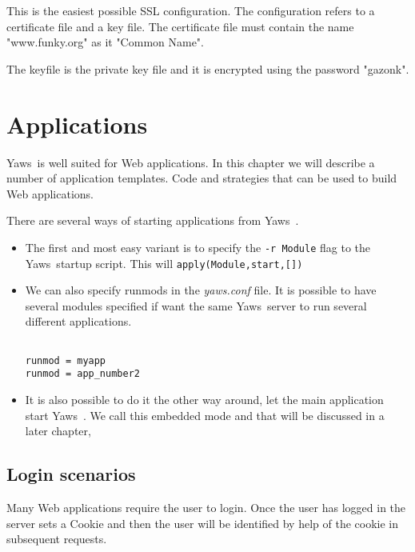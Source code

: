 \documentclass[11pt,oneside,english]{book}
\newcommand{\Yaws}            %
        {{\sc Yaws}}
\begin{document}
This is the easiest possible SSL configuration. The configuration
refers to a certificate file and a key file. The certificate file
must contain the name "www.funky.org" as it "Common Name".

The keyfile is the private key file and it is encrypted using
the password "gazonk".






\chapter{Applications}

\Yaws\  is well suited for Web applications. In this chapter we will
describe a number of application templates. Code and strategies that
can be used to build Web applications.

There are several ways of starting applications from
\Yaws\  .

\begin{itemize}
\item The first and most easy variant is to specify
the \verb+-r Module+ flag to the \Yaws\  startup script.
This will \verb+apply(Module,start,[])+

\item We can also specify runmods in the \textit{yaws.conf} file.
It is possible to have several modules specified if want
the same \Yaws\  server to run several different applications.

\begin{verbatim}

runmod = myapp
runmod = app_number2

\end{verbatim}

\item It is also possible to do it the other way around, let
the main application start \Yaws\ . We call this embedded mode
and that will be discussed in a later chapter,

\end{itemize}



\section{Login scenarios}

Many Web applications require the user to login. Once the user has
logged in the server sets a Cookie and then the user will be
identified by help of the cookie in subsequent requests.
\end{document}

